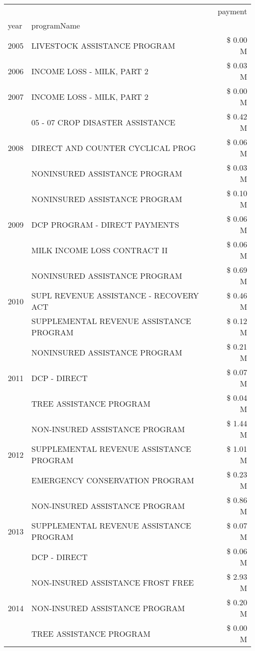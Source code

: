 \begin{tabular}{llr}
\toprule
 &  & payment \\
year & programName &  \\
\midrule
2005 & LIVESTOCK ASSISTANCE PROGRAM & \$ 0.00 M \\
\cline{1-3}
2006 & INCOME LOSS - MILK, PART 2 & \$ 0.03 M \\
\cline{1-3}
2007 & INCOME LOSS - MILK, PART 2 & \$ 0.00 M \\
\cline{1-3}
\multirow[t]{3}{*}{2008} & 05 - 07 CROP DISASTER ASSISTANCE & \$ 0.42 M \\
 & DIRECT AND COUNTER CYCLICAL PROG & \$ 0.06 M \\
 & NONINSURED ASSISTANCE PROGRAM & \$ 0.03 M \\
\cline{1-3}
\multirow[t]{3}{*}{2009} & NONINSURED ASSISTANCE PROGRAM & \$ 0.10 M \\
 & DCP PROGRAM - DIRECT PAYMENTS & \$ 0.06 M \\
 & MILK INCOME LOSS CONTRACT II & \$ 0.06 M \\
\cline{1-3}
\multirow[t]{3}{*}{2010} & NONINSURED ASSISTANCE PROGRAM & \$ 0.69 M \\
 & SUPL REVENUE ASSISTANCE - RECOVERY ACT & \$ 0.46 M \\
 & SUPPLEMENTAL REVENUE ASSISTANCE PROGRAM & \$ 0.12 M \\
\cline{1-3}
\multirow[t]{3}{*}{2011} & NONINSURED ASSISTANCE PROGRAM & \$ 0.21 M \\
 & DCP - DIRECT & \$ 0.07 M \\
 & TREE ASSISTANCE PROGRAM & \$ 0.04 M \\
\cline{1-3}
\multirow[t]{3}{*}{2012} & NON-INSURED ASSISTANCE PROGRAM & \$ 1.44 M \\
 & SUPPLEMENTAL REVENUE ASSISTANCE PROGRAM & \$ 1.01 M \\
 & EMERGENCY CONSERVATION PROGRAM & \$ 0.23 M \\
\cline{1-3}
\multirow[t]{3}{*}{2013} & NON-INSURED ASSISTANCE PROGRAM & \$ 0.86 M \\
 & SUPPLEMENTAL REVENUE ASSISTANCE PROGRAM & \$ 0.07 M \\
 & DCP - DIRECT & \$ 0.06 M \\
\cline{1-3}
\multirow[t]{3}{*}{2014} & NON-INSURED ASSISTANCE FROST FREE & \$ 2.93 M \\
 & NON-INSURED ASSISTANCE PROGRAM & \$ 0.20 M \\
 & TREE ASSISTANCE PROGRAM & \$ 0.00 M \\

\end{tabular}
